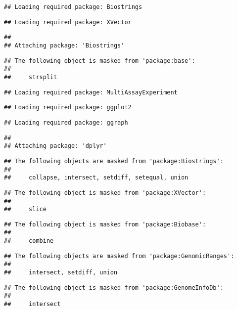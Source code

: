 \documentclass[
  oneside]{book}
\begin{document}
\begin{verbatim}
## Loading required package: Biostrings
\end{verbatim}

\begin{verbatim}
## Loading required package: XVector
\end{verbatim}

\begin{verbatim}
## 
## Attaching package: 'Biostrings'
\end{verbatim}

\begin{verbatim}
## The following object is masked from 'package:base':
## 
##     strsplit
\end{verbatim}

\begin{verbatim}
## Loading required package: MultiAssayExperiment
\end{verbatim}

\begin{verbatim}
## Loading required package: ggplot2
\end{verbatim}

\begin{verbatim}
## Loading required package: ggraph
\end{verbatim}

\begin{verbatim}
## 
## Attaching package: 'dplyr'
\end{verbatim}

\begin{verbatim}
## The following objects are masked from 'package:Biostrings':
## 
##     collapse, intersect, setdiff, setequal, union
\end{verbatim}

\begin{verbatim}
## The following object is masked from 'package:XVector':
## 
##     slice
\end{verbatim}

\begin{verbatim}
## The following object is masked from 'package:Biobase':
## 
##     combine
\end{verbatim}

\begin{verbatim}
## The following objects are masked from 'package:GenomicRanges':
## 
##     intersect, setdiff, union
\end{verbatim}

\begin{verbatim}
## The following object is masked from 'package:GenomeInfoDb':
## 
##     intersect
\end{verbatim}
\end{document}
